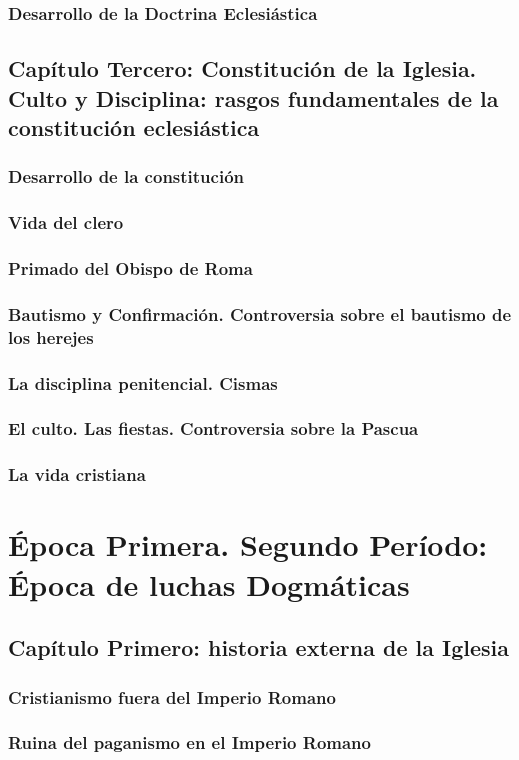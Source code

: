 \raggedbottom{} \documentclass[12pt, a4paper]{book}
\begin{document}
\section{Desarrollo de la Doctrina Eclesiástica}
\chapter{Capítulo Tercero: Constitución de la Iglesia. Culto y Disciplina: rasgos fundamentales de la constitución eclesiástica}
\section{Desarrollo de la constitución}
\section{Vida del clero}
\section{Primado del Obispo de Roma}
\section{Bautismo y Confirmación. Controversia sobre el bautismo de los herejes}
\section{La disciplina penitencial. Cismas}
\section{El culto. Las fiestas. Controversia sobre la Pascua}
\section{La vida cristiana}
\part{Época Primera. Segundo Período: Época de luchas Dogmáticas}
\chapter{Capítulo Primero: historia externa de la Iglesia}
\section{Cristianismo fuera del Imperio Romano}
\section{Ruina del paganismo en el Imperio Romano}
\end{document}
